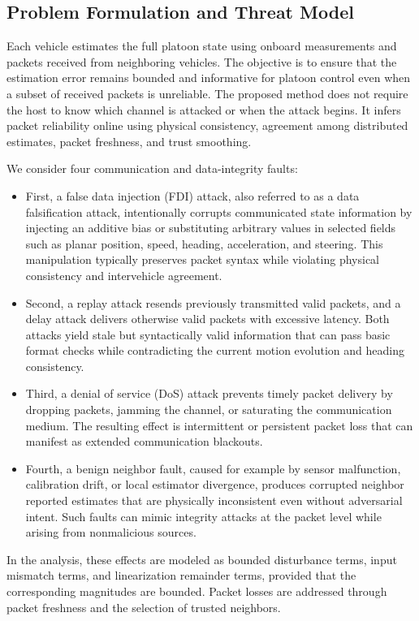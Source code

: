 \documentclass[journal,twoside]{IEEEtran}
\begin{document}
\subsection{Problem Formulation and Threat Model}\label{subsec_threat_model}

Each vehicle estimates the full platoon state using onboard measurements and packets received from neighboring vehicles. The objective is to ensure that the estimation error remains bounded and informative for platoon control even when a subset of received packets is unreliable.
The proposed method does not require the host to know which channel is attacked or when the attack begins. It infers packet reliability online using physical consistency, agreement among distributed estimates, packet freshness, and trust smoothing.

We consider four communication and data-integrity faults:
\begin{itemize}
    \item First, a false data injection (FDI) attack, also referred to as a data falsification attack, intentionally corrupts communicated state information by injecting an additive bias or substituting arbitrary values in selected fields such as planar position, speed, heading, acceleration, and steering. This manipulation typically preserves packet syntax while violating physical consistency and intervehicle agreement.
    \item Second, a replay attack resends previously transmitted valid packets, and a delay attack delivers otherwise valid packets with excessive latency. Both attacks yield stale but syntactically valid information that can pass basic format checks while contradicting the current motion evolution and heading consistency.
    \item Third, a denial of service (DoS) attack prevents timely packet delivery by dropping packets, jamming the channel, or saturating the communication medium. The resulting effect is intermittent or persistent packet loss that can manifest as extended communication blackouts.
    \item Fourth, a benign neighbor fault, caused for example by sensor malfunction, calibration drift, or local estimator divergence, produces corrupted neighbor reported estimates that are physically inconsistent even without adversarial intent. Such faults can mimic integrity attacks at the packet level while arising from nonmalicious sources.
\end{itemize}
In the analysis, these effects are modeled as bounded disturbance terms, input mismatch terms, and linearization remainder terms, provided that the corresponding magnitudes are bounded. Packet losses are addressed through packet freshness and the selection of trusted neighbors.
\end{document}

